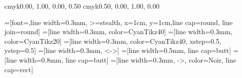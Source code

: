 
\usepackage{esvect,cancel} 
\newcommand{\chapeaumelon}[1]{\stackrel{\Large \frown}{#1}}

\usepackage{tikz,xparse}%
\usepackage{tkz-tab,tkz-euclide}
\usepackage{pgf}
\usetikzlibrary{calc} %
\usetikzlibrary{arrows}
\usetikzlibrary{patterns}  
\usetikzlibrary{intersections}%
\usetikzlibrary{shapes.geometric}
\usepackage{tikzpeople}


\definecolor{B1prime}      {cmyk}{0.00, 1.00, 0.00, 0.50}
\definecolor{H1prime}      {cmyk}{0.50, 0.00, 1.00, 0.00}

         =[font=\fontsize{7.5}{9}\selectfont,line width=0.3mm, >=stealth, x=1cm, y=1cm,line cap=round, line join=round]
     =[line width=0.3mm, color=CyanTikz40]
 =[line width=0.3mm, color=CyanTikz20]
   =[line width=0.3mm, color=CyanTikz40, xstep=0.5, ystep=0.5]
            =[line width=0.3mm, <->]
           =[line width=0.5mm, line cap=butt]
      =[line width=0.8mm, line cap=butt]
             =[line width=0.3mm, ->, color=Noir, line cap=rect]
\newcommand{\quadrillageSeyes}[2]{%
  \draw[line width=0.3mm, color=A1!10, ystep=0.2, xstep=0.8] #1 grid #2;
  \draw[line width=0.3mm, color=A1!30, xstep=0.8, ystep=0.8] #1 grid #2;
}

\newcommand*\circled[1]{\tikz[baseline=(char.base)]{
	\node[shape=circle,draw,inner sep=1pt] (char) {#1};}}


